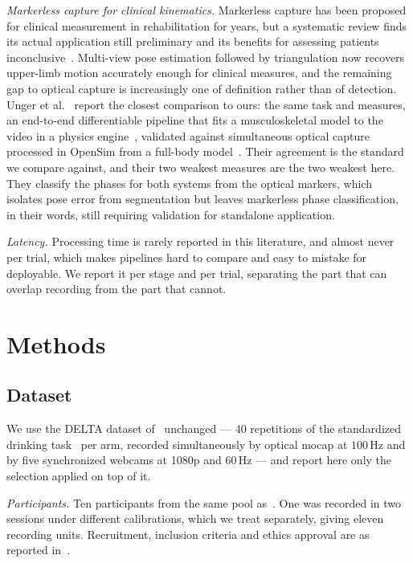 \documentclass[conference]{IEEEtran}
\begin{document}
\emph{Markerless capture for clinical kinematics.} Markerless capture has been
proposed for clinical measurement in rehabilitation for years, but a systematic
review finds its actual application still preliminary and its benefits for
assessing patients inconclusive~\cite{lam2023}. Multi-view pose estimation
followed by triangulation now recovers upper-limb motion accurately enough for
clinical measures, and the remaining gap to optical capture is increasingly one
of definition rather than of detection. Unger et al.~\cite{unger2024} report the
closest comparison to ours: the same task and measures, an end-to-end
differentiable pipeline that fits a musculoskeletal model to the video in a
physics engine~\cite{todorov2012}, validated against simultaneous optical
capture processed in OpenSim from a full-body model~\cite{rajagopal2016}. Their agreement is the standard we compare
against, and their two weakest measures are the two weakest here. They classify
the phases for both systems from the optical markers, which isolates pose error
from segmentation but leaves markerless phase classification, in their words,
still requiring validation for standalone application.

\emph{Latency.} Processing time is rarely reported in this literature, and
almost never per trial, which makes pipelines hard to compare and easy to mistake
for deployable. We report it per stage and per trial, separating the part that
can overlap recording from the part that cannot.

\section{Methods}
\label{sec:methods}

\subsection{Dataset}
\label{sec:dataset}
We use the DELTA dataset of~\cite{unger2024} unchanged --- 40 repetitions of
the standardized drinking task~\cite{murphy2011} per arm, recorded
simultaneously by optical mocap at $100$\,Hz and by five synchronized webcams
at 1080p and $60$\,Hz --- and report here only the selection applied on top of
it.

\emph{Participants.} Ten participants from the same pool as~\cite{unger2024}.
One was recorded in two sessions under different calibrations, which we treat
separately, giving eleven recording units. Recruitment, inclusion criteria and
ethics approval are as reported in~\cite{unger2024}.
\end{document}
